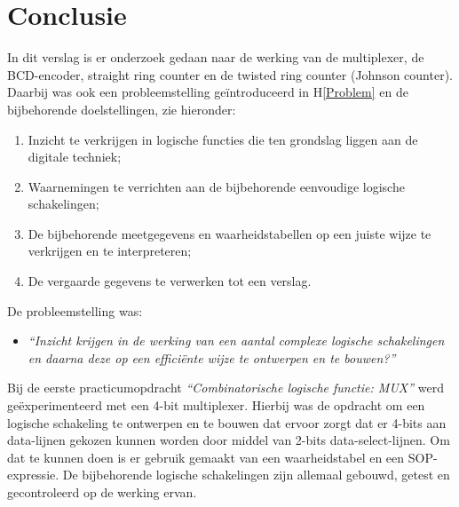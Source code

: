 \documentclass[12pt]{article}
\begin{document}
\section{Conclusie}
\label{Conclusie}
In dit verslag is er onderzoek gedaan naar de werking van de multiplexer, de BCD-encoder, straight ring counter en de twisted ring counter (Johnson counter). 
Daarbij was ook een probleemstelling geïntroduceerd in H\ref{Problem} en de bijbehorende doelstellingen, zie hieronder:
\begin{enumerate}
    \item Inzicht te verkrijgen in logische functies die ten grondslag liggen aan de digitale techniek;
    \item Waarnemingen te verrichten aan de bijbehorende eenvoudige logische schakelingen;
    \item De bijbehorende meetgegevens en waarheidstabellen op een juiste wijze te verkrijgen en te interpreteren;
    \item De vergaarde gegevens te verwerken tot een verslag.
\end{enumerate}
De probleemstelling was:
\begin{itemize}
    \item \textit{``Inzicht krijgen in de werking van een aantal complexe logische schakelingen en daarna deze op een efficiënte wijze te ontwerpen en te bouwen?''}
\end{itemize}

Bij de eerste practicumopdracht \textit{``Combinatorische logische functie: MUX''} werd geëxperimenteerd met een 4-bit multiplexer. 
Hierbij was de opdracht om een logische schakeling te ontwerpen en te bouwen dat ervoor zorgt dat er 4-bits aan data-lijnen gekozen kunnen worden door middel van 2-bits data-select-lijnen.
Om dat te kunnen doen is er gebruik gemaakt van een waarheidstabel en een SOP-expressie. 
De bijbehorende logische schakelingen zijn allemaal gebouwd, getest en gecontroleerd op de werking ervan. 
\end{document}
